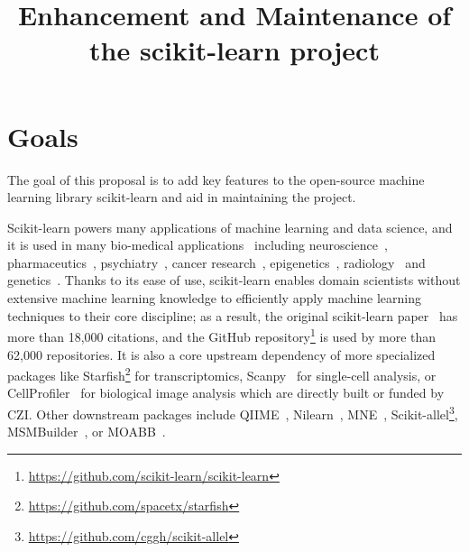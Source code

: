 \documentclass[11pt]{article}  %
\title{Enhancement and Maintenance of the scikit-learn project\vspace{-3ex}}
\date{\vspace{-5ex}}
\begin{document}
\maketitle
\section{Goals}



The goal of this proposal is to add key features to the open-source machine learning library scikit-learn and aid in maintaining the project.

Scikit-learn powers many applications of machine learning and data science,
and it is used in many bio-medical
applications~\cite{roles_of_ml_in_biomed_science} including neuroscience~\cite{zandifar2017comparison, valera2016stereotyped, spike_sorting}, pharmaceutics~\cite{lindh2017predicting, lorberbaum2015systems, segler2017generating}, psychiatry~\cite{schmidt2015approaching, 10.1001/2013.jamapsychiatry.5, patel2015machine}, cancer research~\cite{bakas2017advancing, TAYLOR2018676, chaudhary2018deep}, epigenetics~\cite{wang2017epigenetic, kakaradov2017early, dogan2018integrated}, radiology~\cite{masino2016temporal,wang2015evaluation} and genetics~\cite{LAMANNO2016566, horlbeck2016compact, brannan2016sonar}. Thanks to its ease of use, scikit-learn enables domain scientists without extensive machine learning knowledge to efficiently apply machine learning techniques to their core
discipline; as a result, the original scikit-learn paper~\cite{scikit-learn} has more
than 18,000 citations, and the GitHub repository\footnote{\href{https://github.com/scikit-learn/scikit-learn}{https://github.com/scikit-learn/scikit-learn}} is used by more than 62,000 repositories. It is also a core upstream dependency of more
specialized packages like Starfish\footnote{\href{https://github.com/spacetx/starfish}{https://github.com/spacetx/starfish}} for transcriptomics, Scanpy~\cite{scanpy} for single-cell analysis, or CellProfiler~\cite{cellprofiler} for biological image analysis which are directly built or funded by CZI. Other downstream packages include
QIIME~\cite{QIIME2, QIIME2_feature_classifier,
QIIME2_sample_classifier}, Nilearn~\cite{Neuro_imaging_sklearn}, MNE~\cite{MNE},
Scikit-allel\footnote{\href{https://github.com/cggh/scikit-allel}{https://github.com/cggh/scikit-allel}},
MSMBuilder~\cite{MSMBuilder}, or MOABB~\cite{MOABB}.
\end{document}
